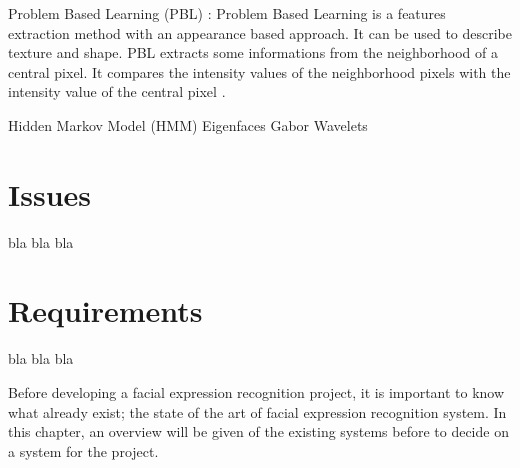 \noindent Problem Based Learning (PBL) : Problem Based Learning is a features extraction method with an appearance based approach. It can be used to describe texture and shape. PBL extracts some informations from the neighborhood of a central pixel. It compares the intensity values of the neighborhood pixels with the intensity value of the central pixel  \cite{GAN08}.
\newline

\noindent Hidden Markov Model (HMM)
\newline
\noindent Eigenfaces
\newline
\noindent Gabor Wavelets
\newline

\section{Issues}

\noindent bla bla bla
\newline

\section{Requirements}

\noindent bla bla bla
\newline









\noindent Before developing a facial expression recognition project, it is important to know what already exist; the state of the art of facial expression recognition system. In this chapter, an overview will be given of the existing systems before to decide on a system for the project.
\newline
